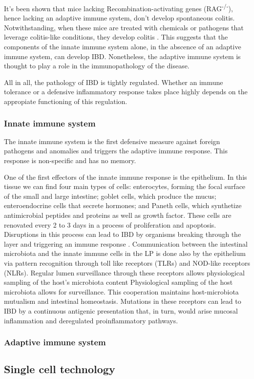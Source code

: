 \documentclass[../main.tex]{subfiles}
\begin{document}
It's been shown that mice lacking Recombination-activating genes (RAG\textsuperscript{-/-}), hence lacking an adaptive immune system, don't develop spontaneous colitis. Notwithstanding, when these mice are treated with chemicals or pathogens that leverage colitis-like conditions, they develop colitis \citep{buonocore_innate_2010}. This suggests that the components of the innate immune system alone, in the abscence of an adaptive immune system, can develop IBD. Nonetheless, the adaptive immune system is thought to play a role in the immunopathology of the disease.

All in all, the pathology of IBD is tightly regulated. Whether an immune tolerance or a defensive inflammatory response takes place highly depends on the appropiate functioning of this regulation. 

\subsubsection{Innate immune system}

The innate immune system is the first defensive measure against foreign pathogens and anomalies and triggers the adaptive immune response. This response is non-specific and has no memory.

One of the first effectors of the innate immune response is the epithelium. In this tissue we can find four main types of cells: enterocytes, forming the focal surface of the small and large intestine; goblet cells, which produce the mucus; enteroendocrine cells that secrete hormones; and Paneth cells, which synthetize antimicrobial peptides and proteins as well as growth factor. These cells are renovated every 2 to 3 days in a process of proliferation and apoptosis. Disruptions in this process can lead to IBD by organisms breaking through the layer and triggering an immune response \citep{sartor_mechanisms_2006}.  Communication between the intestinal microbiota and the innate immune cells in the LP is done also by the epithelium via pattern recognition through toll like receptors (TLRs) and NOD-like receptors (NLRs). Regular lumen surveillance through these receptors allows physiological sampling of the host's microbiota content Physiological sampling of the host microbiota allows for surveillance. This cooperation maintains host-microbiota mutualism \citep{slack_innate_2009} and intestinal homeostasis. Mutations in these receptors \citep{saruta_high-frequency_2009, natividad_commensal_2012} can lead to IBD by a continuous antigenic presentation that, in turn, would arise mucosal inflammation and deregulated proinflammatory pathways.



\subsubsection{Adaptive immune system}
\lipsum[1-1]


\subsection{Single cell technology}
\lipsum[1-1]
\end{document}
